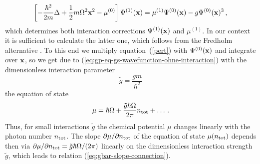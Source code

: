 \documentclass[12pt, a4paper]{iopart}
\begin{document}
\begin{appendix}
\begin{equation}
\left[-\frac{\hbar^2}{2m} \Delta + \frac{1}{2}m \Omega^2 {\bf x}^2 - \mu^{(0)} \right] \Psi^{(1)}({\bf x}) = \mu^{(1)} \Psi^{(0)}({\bf x}) - g \Psi^{(0)}({\bf x})^3\,, 
\end{equation}
%
which determines both interaction corrections $\Psi^{(1)}({\bf x})$ and $\mu^{(1)}$. In our context it is sufficient to calculate the latter one, which follows from the Fredholm alternative \cite{Fredholm}. To this end we multiply equation~(\ref{pert}) with $\Psi^{(0)}({\bf x})$ and integrate over ${\bf x}$, so we get due to (\ref{eq:gp-eq-gs-wavefunction-ohne-interaction}) with 
the dimensionless interaction parameter \cite{Dalibard}
%
\begin{equation}
\label{eq:interaction_dimensionlos_def}
\tilde{g} = \frac{g m}{\hbar^2}
\end{equation}
%
the equation of state
%
\begin{equation}
\label{eq:chem_pot_gl_dimlos}
\mu = \hbar \Omega + \frac{\tilde{g} \hbar \Omega}{ 2\pi} n_{\rm tot} + \ldots \,.
\end{equation} 
%
Thus, for small interactions $\tilde{g}$ the chemical potential $\mu$ changes linearly with the photon number $n_{\rm tot}$. The slope $\partial \mu / \partial n_{\rm tot}$ of the equation of state $\mu ( n_{\rm tot} )$
depends then via $\partial \mu / \partial n_{\rm tot} = \tilde{g} \hbar \Omega / (2\pi)$ linearly on the dimensionless interaction strength $\tilde{g}$, which leads to relation (\ref{eq:gbar-slope-connection}).
\end{appendix}
\end{document}
